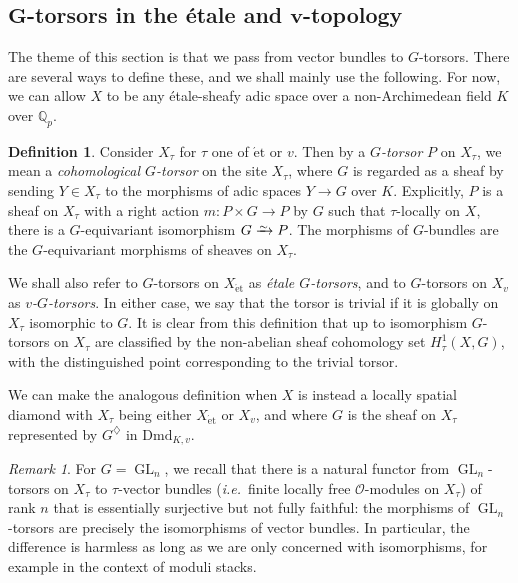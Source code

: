\documentclass[11pt]{amsart}
\numberwithin{equation}{section}
\theoremstyle{definition}
\newtheorem{Definition}[thm]{Definition}
\theoremstyle{remark}
\newtheorem{Remark}[thm]{Remark}
\newcommand*{\lowsim}{\vbox to 0pt{\vss\hbox{$\scriptstyle\sim$}\vskip-2pt}}
\newcommand*{\isomarrow}{\xrightarrow{\lowsim}}
\renewcommand{\O}{\mathcal{O}}
\newcommand{\Q}{\mathbb{Q}}
\newcommand{\GL}{\operatorname{GL}}
\newcommand{\et}{{\operatorname{\acute{e}t}}}
\newcommand{\Dmd}{\mathrm{Dmd}}
\begin{document}
\subsection{$\boldsymbol{G}$-torsors in the \'etale and $\boldsymbol{v}$-topology}\label{s:G-torsors}
The theme of this section is that we pass from vector bundles to $G$-torsors. There are several ways to define these, and we shall mainly use the following. For now, we can allow $X$ to be any \'etale-sheafy adic space over a non-Archimedean field $K$ over $\Q_p$.


\begin{Definition}\label{d:G-torsors}
	Consider $X_{\tau}$ for $\tau$ one of $\et$ or $v$. Then by a \emph{$G$-torsor} $P$ on $X_{\tau}$, we mean a \emph{cohomological $G$-torsor} on the site $X_{\tau}$, where $G$ is regarded as a sheaf by sending $Y\in X_\tau$ to the morphisms of adic spaces $Y\to G$ over $K$. Explicitly, $P$ is a sheaf on $X_{\tau}$ with a right action $m\colon P\times G\to P$ by $G$ such that $\tau$-locally on $X$, there is a $G$-equivariant isomorphism $G\isomarrow P$. The morphisms of $G$-bundles are the $G$-equivariant morphisms of sheaves on $X_{\tau}$.
	
	We shall also refer to $G$-torsors on $X_{\et}$ as \emph{\'etale $G$-torsors}, and  to $G$-torsors on $X_{v}$ as \emph{$v$-$G$-torsors}.
	In either case, we say that the torsor is trivial if it is globally on $X_\tau$ isomorphic to $G$. 
	It is clear from this definition that up to isomorphism $G$-torsors on $X_{\tau}$  are classified by the non-abelian sheaf cohomology set 
	$H^1_{\tau}(X,G)$, with the distinguished point corresponding to the trivial torsor.
	
	We can make the analogous definition when $X$ is instead a locally spatial diamond with $X_\tau$ being either $X_\et$ or $X_v$, and where $G$ is the sheaf on $X_\tau$ represented by $G^\diamondsuit$ in $\Dmd_{K,v}$.
\end{Definition}

\begin{Remark}\label{r:GL_n-torsor-vs-vector-torsor}
	For $G=\GL_n$, we recall that there is a natural functor from $\GL_n$-torsors on $X_{\tau}$ to $\tau$-vector bundles (\textit{i.e.}~finite locally free $\O$-modules on $X_\tau$) of rank $n$ that is essentially surjective but not fully faithful: the morphisms of $\GL_n$-torsors are precisely the isomorphisms of vector bundles. In particular, the difference is harmless as long as we are only concerned with isomorphisms, for example in the context of moduli stacks.
\end{Remark}
\end{document}
